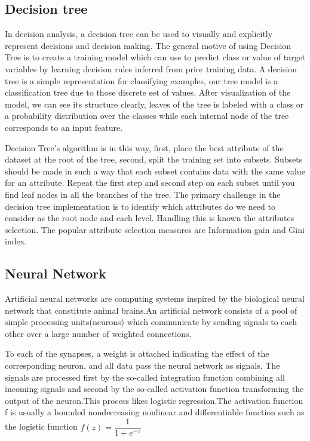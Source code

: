 \documentclass[12pt, a4paper, bibliography=totoc, english]{scrartcl}
\begin{document}
	\subsection{Decision tree}\label{DT}
	In decision analysis, a decision tree can be used to visually and explicitly represent decisions and decision making. The general motive of using Decision Tree is to create a training model which can use to predict class or value of target variables by learning decision rules inferred from prior training data. A decision tree is a simple representation for classifying examples, our tree model is a classification tree due to those discrete set of values. After visualization of the model, we can see its structure clearly, leaves of the tree is labeled with a class or a probability distribution over the classes while each internal node of the tree corresponds to an input feature. 
	
	Decision Tree's algorithm is in this way, first, place the best attribute of the dataset at the root of the tree, second, split the training set into subsets. Subsets should be made in such a way that each subset contains data with the same value for an attribute. Repeat the first step and second step on each subset until you find leaf nodes in all the branches of the tree. The primary challenge in the decision tree implementation is to identify which attributes do we need to consider as the root node and each level. Handling this is known the attributes selection. The popular attribute selection measures are Information gain and Gini index. 
	
	
	\subsection{Neural Network}\label{NN}
	Artificial neural networks are computing systems inspired by the biological neural network that constitute animal brains.An artificial network consists of a pool of simple processing units(neurons) which communicate by sending signals to each other over a large number of weighted connections.
	
	To each of the synapses, a weight is attached indicating the effect of the corresponding neuron, and all data pass the neural network as signals. The signals are processed first by the so-called integration function combining all incoming signals and second by the so-called activation function transforming the output of the neuron.This process likes logistic regression.The activation function f is usually a bounded nondecreasing nonlinear and differentiable function such as the logistic function  $f(z)=\dfrac{1}{1+e^{-z}}$
	
\end{document}
